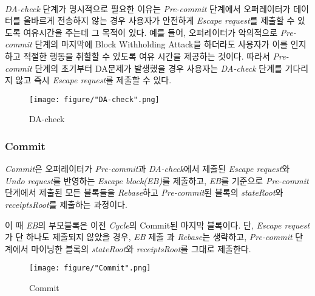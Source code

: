 \documentclass[letterpaper, 11pt]{article}
\begin{document}
\begin{CJK}{UTF8}{mj}
\paragraph{}
\emph{DA-check} 단계가 명시적으로 필요한 이유는 \emph{Pre-commit} 단계에서 오퍼레이터가 데이터를 올바르게 전송하지 않는 경우 사용자가 안전하게 \emph{Escape request}를 제출할 수 있도록 여유시간을 주는데 그 목적이 있다. 예를 들어, 오퍼레이터가 악의적으로 \emph{Pre-commit} 단계의 마지막에 Block Withholding Attack을 하더라도 사용자가 이를 인지하고 적절한 행동을 취할할 수 있도록 여유 시간을 제공하는 것이다. 따라서 \emph{Pre-commit} 단계의 초기부터 DA문제가 발생했을 경우 사용자는 \emph{DA-check} 단계를 기다리지 않고 즉시 \emph{Escape request}를 제출할 수 있다.

\begin{figure}[!h]
\centering
\texttt{[image: figure/"DA-check".png]}
\caption{DA-check}
\label{fig:da-check}
\end{figure}

\end{CJK}

\subsubsection{Commit}
\begin{CJK}{UTF8}{mj}
\emph{Commit}은 오퍼레이터가 \emph{Pre-commit}과 \emph{DA-check}에서 제출된 \emph{Escape request}와 \emph{Undo request}를 반영하는 \emph{Escape block(EB)}를 제출하고, \emph{EB}를 기준으로 \emph{Pre-commit}단계에서 제출된 모든 블록들을 \emph{Rebase}하고 \emph{Pre-commit}된 블록의 \emph{stateRoot}와 \emph{receiptsRoot}를 제출하는 과정이다.

이 때 \emph{EB}의 부모블록은 이전 \emph{Cycle}의 Commit된 마지막 블록이다. 단, \emph{Escape request}가 단 하나도 제출되지 않았을 경우, \emph{EB} 제출 과 \emph{Rebase}는 생략하고, \emph{Pre-commit} 단계에서 마이닝한 블록의 \emph{stateRoot}와 \emph{receiptsRoot}를 그대로 제출한다.

\begin{figure}[!h]
\centering
\texttt{[image: figure/"Commit".png]}
\caption{Commit}
\label{fig:commit-diagram}
\end{figure}

\end{CJK}
\end{document}
